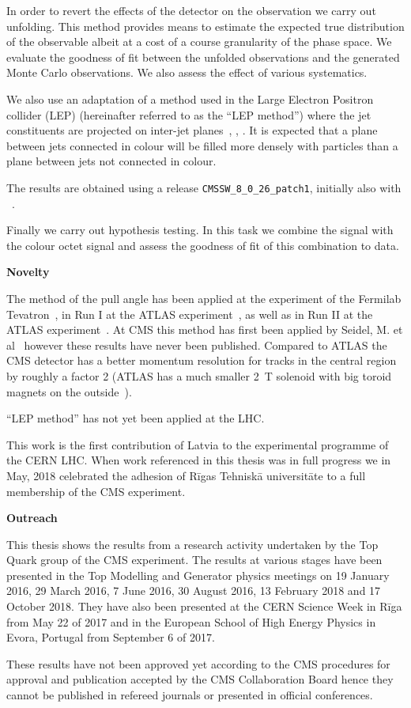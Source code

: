 In order to revert the effects of the detector on the observation we carry out unfolding. This method provides means to estimate the expected true distribution of the observable albeit at a cost of a course granularity of the phase space. We evaluate the goodness of fit between the unfolded observations and the generated Monte Carlo observations. We also assess the effect of various systematics.  

We also use an adaptation of a method used in the Large Electron Positron collider (LEP) (hereinafter referred to as the ``LEP method'') where the jet constituents are projected on inter-jet planes~\cite{Abbiendi:2005es}, \cite{Abdallah:2006uq}, \cite{Achard:2003pe}. It is expected that a plane between jets connected in colour will be filled more densely with particles than a plane between jets not connected in colour.   

The results are obtained using a \CMSSW release \lstinline[language=sh]|CMSSW_8_0_26_patch1|, initially also with \RIVET~\cite{Buckley:2010ar}.

Finally we carry out hypothesis testing. In this task we combine the \ttbar signal with the colour octet \PW signal and assess the goodness of fit of this combination to data. 

\medskip
\textbf{Novelty}
\nopagebreak\medskip

The method of the pull angle has been applied at the \DZERO experiment of the Fermilab Tevatron~\cite{Abazov:2011vh}, in Run I at the ATLAS experiment~\cite{Aad:2015lxa}, as well as in Run II at the ATLAS experiment~\cite{Aaboud:2018ibj}. At CMS this method has first been applied by Seidel, M. et al~\cite{indico:Markus_cf} however these results have never been published. Compared to ATLAS the CMS detector has a better momentum resolution for tracks in the central region by roughly a factor 2 (ATLAS has a much smaller 2~T solenoid with big toroid magnets on the outside~\cite{Aad:2008zzm}).

``LEP method'' has not yet been applied at the LHC.

This work is the first contribution of Latvia to the experimental programme of the CERN LHC. When work referenced in this thesis was in full progress we in May, 2018 celebrated the adhesion of Rīgas Tehniskā universitāte to a full membership of the CMS experiment. 

\medskip
\textbf{Outreach}
\nopagebreak\medskip

This thesis shows the results from a research activity undertaken by the Top Quark group of the CMS experiment. The results at various stages have been presented in the Top Modelling and Generator physics meetings on 19 January 2016, 29 March 2016, 7 June 2016, 30 August 2016, 13 February 2018 and 17 October 2018. They have also been presented at the CERN Science Week in Rīga from May 22 of 2017 and in the European School of High Energy Physics in Evora, Portugal from September 6 of 2017.

These results have not been approved yet according to the CMS procedures for approval and publication accepted by the CMS Collaboration Board hence they cannot be published in refereed journals or presented in official conferences.
